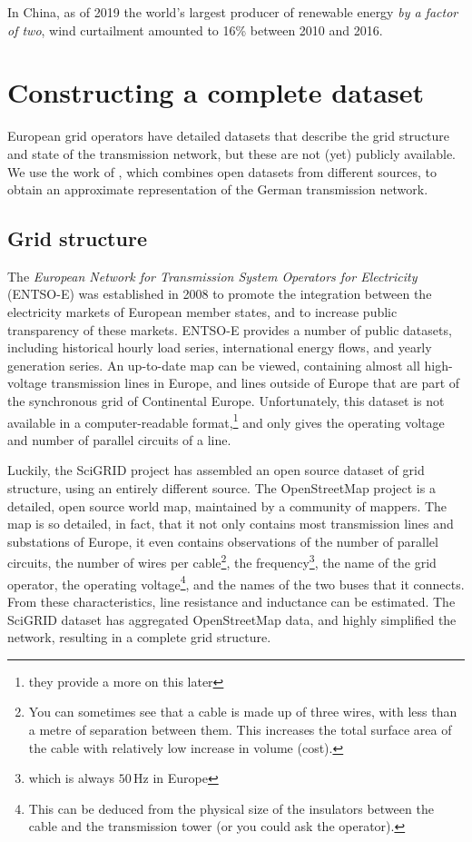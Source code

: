 \documentclass[main.tex]{subfiles}
\begin{document}
In China, as of 2019 the world's largest producer of renewable energy \emph{by a factor of two},  wind curtailment amounted to 16\% between 2010 and 2016. \citep{Qi2018} 



\section{Constructing a complete dataset}\label{sec:constructingdataset}
European grid operators have detailed datasets that describe the grid structure and state of the transmission network, but these are not (yet) publicly available. We use the work of \cite{PyPSA}, which combines open datasets from different sources, to obtain an approximate representation of the German transmission network. 

\subsection{Grid structure}
The \emph{European Network for Transmission System Operators for Electricity} (ENTSO-E) was established in 2008 to promote the integration between the electricity markets of European member states, and to increase public transparency of these markets.
ENTSO-E provides a number of public datasets, including historical hourly load series, international energy flows, and yearly generation series.
An up-to-date map can be viewed, containing almost all high-voltage transmission lines in Europe, and lines outside of Europe that are part of the synchronous grid of Continental Europe. Unfortunately, this dataset is not available in a computer-readable format,\footnote{they provide a more on this later} and only gives the operating voltage and number of parallel circuits of a line.

Luckily, the SciGRID project has assembled an open source dataset of grid structure, using an entirely different source. The OpenStreetMap project is a detailed, open source world map, maintained by a community of mappers. The map is so detailed, in fact, that it not only contains most transmission lines and substations of Europe, it even contains observations of the number of parallel circuits, the number of wires per cable\footnote{You can sometimes see that a cable is made up of three wires, with less than a metre of separation between them. This increases the total surface area of the cable with relatively low increase in volume (\ie cost).}, the frequency\footnote{which is always $50\,\si{\hertz}$ in Europe}, the name of the grid operator, the operating voltage\footnote{This can be deduced from the physical size of the insulators between the cable and the transmission tower (or you could ask the operator).}, and the names of the two buses that it connects. From these characteristics, line resistance and inductance can be estimated.
The SciGRID dataset has aggregated OpenStreetMap data, and highly simplified the network, resulting in a complete grid structure.
\end{document}

